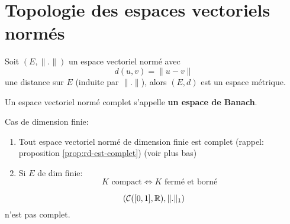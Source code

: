 \section{Topologie des espaces vectoriels normés}
\begin{prop}
    Soit $(E, \| . \|)$ un espace vectoriel normé avec 
     \[
    d(u, v) = \|u - v\|
    \] 
    une distance sur $E$ (induite par $\| . \|$), alors  $(E, d)$ est un espace métrique.
\end{prop}
\begin{definition}
    Un espace vectoriel normé complet s'appelle \textbf{un espace de Banach}.
\end{definition}
Cas de dimension finie:
\begin{enumerate}
    \item Tout espace vectoriel normé de dimension finie est complet (rappel: proposition \ref{prop:rd-est-complet}) (voir plus bas)
    \item Si $E$ de dim finie:
         \[
        K \text{ compact} \iff K \text{ fermé et borné }
        \] 
\end{enumerate}
\begin{lemma}
   \[
       \left( \mathcal{C}([0, 1], \mathbb{R}), \|.\|_1 \right) 
   \]  
   n'est pas complet.
\end{lemma}
